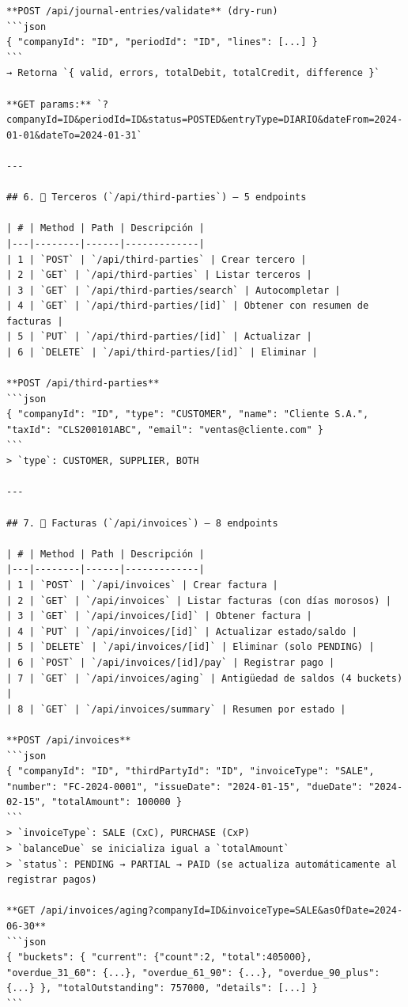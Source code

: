 \documentclass[12pt, a4paper, oneside]{book}
\begin{document}
\begin{lstlisting}
**POST /api/journal-entries/validate** (dry-run)
```json
{ "companyId": "ID", "periodId": "ID", "lines": [...] }
```
→ Retorna `{ valid, errors, totalDebit, totalCredit, difference }`

**GET params:** `?companyId=ID&periodId=ID&status=POSTED&entryType=DIARIO&dateFrom=2024-01-01&dateTo=2024-01-31`

---

## 6. 👥 Terceros (`/api/third-parties`) — 5 endpoints

| # | Method | Path | Descripción |
|---|--------|------|-------------|
| 1 | `POST` | `/api/third-parties` | Crear tercero |
| 2 | `GET` | `/api/third-parties` | Listar terceros |
| 3 | `GET` | `/api/third-parties/search` | Autocompletar |
| 4 | `GET` | `/api/third-parties/[id]` | Obtener con resumen de facturas |
| 5 | `PUT` | `/api/third-parties/[id]` | Actualizar |
| 6 | `DELETE` | `/api/third-parties/[id]` | Eliminar |

**POST /api/third-parties**
```json
{ "companyId": "ID", "type": "CUSTOMER", "name": "Cliente S.A.", "taxId": "CLS200101ABC", "email": "ventas@cliente.com" }
```
> `type`: CUSTOMER, SUPPLIER, BOTH

---

## 7. 🧾 Facturas (`/api/invoices`) — 8 endpoints

| # | Method | Path | Descripción |
|---|--------|------|-------------|
| 1 | `POST` | `/api/invoices` | Crear factura |
| 2 | `GET` | `/api/invoices` | Listar facturas (con días morosos) |
| 3 | `GET` | `/api/invoices/[id]` | Obtener factura |
| 4 | `PUT` | `/api/invoices/[id]` | Actualizar estado/saldo |
| 5 | `DELETE` | `/api/invoices/[id]` | Eliminar (solo PENDING) |
| 6 | `POST` | `/api/invoices/[id]/pay` | Registrar pago |
| 7 | `GET` | `/api/invoices/aging` | Antigüedad de saldos (4 buckets) |
| 8 | `GET` | `/api/invoices/summary` | Resumen por estado |

**POST /api/invoices**
```json
{ "companyId": "ID", "thirdPartyId": "ID", "invoiceType": "SALE", "number": "FC-2024-0001", "issueDate": "2024-01-15", "dueDate": "2024-02-15", "totalAmount": 100000 }
```
> `invoiceType`: SALE (CxC), PURCHASE (CxP)  
> `balanceDue` se inicializa igual a `totalAmount`  
> `status`: PENDING → PARTIAL → PAID (se actualiza automáticamente al registrar pagos)

**GET /api/invoices/aging?companyId=ID&invoiceType=SALE&asOfDate=2024-06-30**
```json
{ "buckets": { "current": {"count":2, "total":405000}, "overdue_31_60": {...}, "overdue_61_90": {...}, "overdue_90_plus": {...} }, "totalOutstanding": 757000, "details": [...] }
```


\end{lstlisting}
\end{document}
